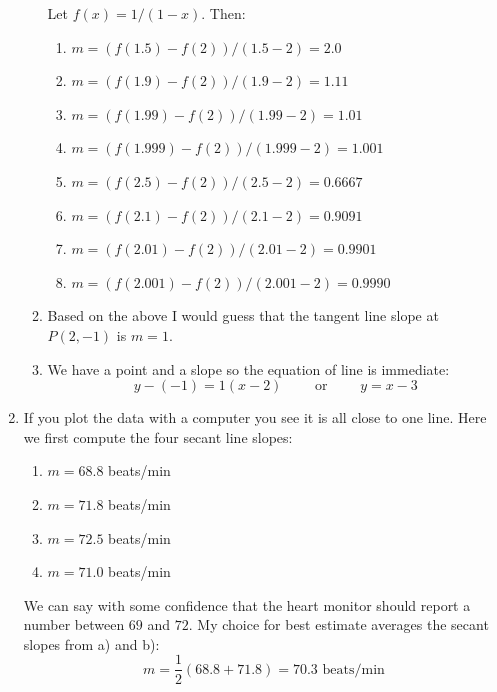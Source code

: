 \documentclass[11pt]{amsart}
\begin{document}
\begin{enumerate}
\begin{enumerate}
    Let $f(x) = 1/(1-x)$.  Then:
        \renewcommand{\labelenumiii}{(\roman{enumiii})}
        \begin{enumerate}
        \item $m = (f(1.5) - f(2)) / (1.5 - 2) = 2.0$
        \item $m = (f(1.9) - f(2)) / (1.9 - 2) = 1.11$
        \item $m = (f(1.99) - f(2)) / (1.99 - 2) = 1.01$
        \item $m = (f(1.999) - f(2)) / (1.999 - 2) = 1.001$
        \item $m = (f(2.5) - f(2)) / (2.5 - 2) = 0.6667$
        \item $m = (f(2.1) - f(2)) / (2.1 - 2) = 0.9091$
        \item $m = (f(2.01) - f(2)) / (2.01 - 2) = 0.9901$
        \item $m = (f(2.001) - f(2)) / (2.001 - 2) = 0.9990$
        \end{enumerate}
    \item Based on the above I would guess that the tangent line slope at $P(2,-1)$ is $m=1$.
    \item We have a point and a slope so the equation of line is immediate:
        $$y - (-1) = 1 (x - 2) \qquad \text{ or } \qquad y = x -3$$
    \end{enumerate}

\item  If you plot the data with a computer you see it is all close to one line.  Here we first compute the four secant line slopes:

    \renewcommand{\labelenumii}{\alph{enumii})}
    \begin{enumerate}
    \item $m=68.8$ beats/min
    \item $m=71.8$ beats/min
    \item $m=72.5$ beats/min
    \item $m=71.0$ beats/min
    \end{enumerate}

We can say with some confidence that the heart monitor should report a number between $69$ and $72$.  My choice for best estimate averages the secant slopes from a) and b):
    $$m = \frac{1}{2} (68.8+71.8) = 70.3 \,\,\text{beats/min}$$
\end{enumerate}
\end{document}
